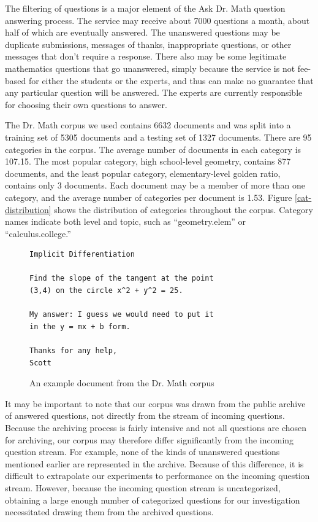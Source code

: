 \documentclass[twocolumn]{article}
\begin{document}
The filtering of questions is a major element of the Ask Dr. Math
question answering process.  The service may receive about 7000
questions a month, about half of which are eventually answered.  The
unanswered questions may be duplicate submissions, messages of thanks,
inappropriate questions, or other messages that don't require a
response.  There also may be some legitimate mathematics questions
that go unanswered, simply because the service is not fee-based for
either the students or the experts, and thus can make no guarantee
that any particular question will be answered.  The experts are
currently responsible for choosing their own questions to answer.

The Dr. Math corpus we used contains 6632 documents and was split into a training
set of 5305 documents and a testing set of 1327 documents.  There are 95 categories 
in the corpus. The average number of documents in each category is
107.15.  The most popular category, high school-level geometry,
contains 877 documents, and the least popular category,
elementary-level golden ratio, contains only 3 documents.  Each
document may be a member of more than one category, and the average
number of categories per document is 1.53.  Figure
\ref{cat-distribution} shows the distribution of categories throughout
the corpus.  Category names indicate both level and topic, such as
``geometry.elem'' or ``calculus.college.''

\begin{figure}
\begin{verbatim}
Implicit Differentiation

Find the slope of the tangent at the point
(3,4) on the circle x^2 + y^2 = 25.

My answer: I guess we would need to put it
in the y = mx + b form. 

Thanks for any help,
Scott
\end{verbatim}
\caption{An example document from the Dr. Math corpus}
\end{figure}

It may be important to note that our corpus was drawn from the public
archive of answered questions, not directly from the stream of
incoming questions.  Because the archiving process is fairly intensive
and not all questions are chosen for archiving, our corpus may
therefore differ significantly from the incoming question stream.  For
example, none of the kinds of unanswered questions mentioned earlier
are represented in the archive.  Because of this difference, it is
difficult to extrapolate our experiments to performance on the
incoming question stream.  However, because the incoming question
stream is uncategorized, obtaining a large enough number of
categorized questions for our investigation necessitated drawing them
from the archived questions.
\end{document}
